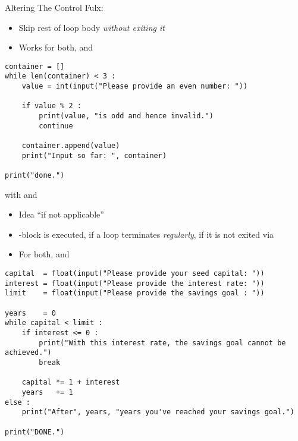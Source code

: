 
\begin{frame}[fragile]{Altering The Control Fulx: }
%
\begin{itemize}
\item Skip rest of loop body \emph{without exiting it}
\item Works for both,  and 
\end{itemize}
%
\begin{codebox}
\begin{verbatim}
container = []
while len(container) < 3 :
    value = int(input("Please provide an even number: "))
    
    if value % 2 :
        print(value, "is odd and hence invalid.")
        continue
        
    container.append(value)
    print("Input so far: ", container)

print("done.")
\end{verbatim}
\end{codebox}
%
\end{frame}


\begin{frame}[fragile]{ with  and }
%
\begin{itemize}
\item Idea \enquote{if not applicable}
\item {}-block is executed, if a loop terminates \emph{regularly}, \ie if it is not exited via 
\item For both,  and 
\end{itemize}
%
\end{frame}


\begin{frame}[fragile]
%
\begin{codebox}
\begin{verbatim}
capital  = float(input("Please provide your seed capital: "))
interest = float(input("Please provide the interest rate: "))
limit    = float(input("Please provide the savings goal : "))

years    = 0
while capital < limit :
    if interest <= 0 :
        print("With this interest rate, the savings goal cannot be achieved.")
        break
    
    capital *= 1 + interest
    years   += 1
else :
    print("After", years, "years you've reached your savings goal.")
  
print("DONE.")
\end{verbatim}
\end{codebox}
%
\end{frame}

